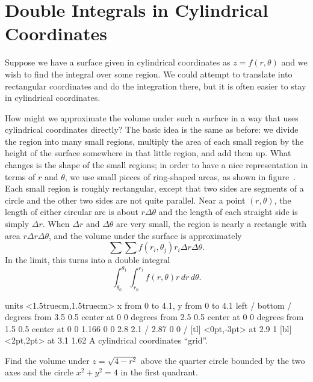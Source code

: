 \section{Double Integrals in Cylindrical Coordinates}{}{}
\nobreak
Suppose we have a surface given in cylindrical coordinates as
$z=f(r,\theta)$ and we wish to find the integral over some region. We
could attempt to translate into rectangular coordinates and do the
integration there, but it is often easier to stay in cylindrical
coordinates.

How might we approximate the volume under such a surface in a way that
uses cylindrical coordinates directly? The basic idea is the same as
before: we divide the region into many small regions, multiply the
area of each small region by the height of the surface somewhere in
that little region, and add them up. What changes is the shape of the
small regions; in order to have a nice representation in terms of $r$
and $\theta$, we use small pieces of ring-shaped areas, as shown in
figure~. Each small region
is roughly rectangular, except that two sides are segments of a circle
and the other two sides are not quite parallel. Near a point
$(r,\theta)$, the length of either circular arc is about
$r\Delta\theta$ and the length of each straight side is simply $\Delta
r$. When $\Delta r$ and $\Delta \theta$ are very small, the region is
nearly a rectangle with area $r\Delta r\Delta\theta$, and the volume
under the surface is approximately
$$\sum\sum f(r_i,\theta_j)r_i\Delta r\Delta\theta.$$
In the limit, this turns into a double integral
$$\int_{\theta_0}^{\theta_1}\int_{r_0}^{r_1} f(r,\theta)r\,dr\,d\theta.$$

\figure
\texonly
\vbox{\beginpicture
\normalgraphs
\ninepoint
\setcoordinatesystem units <1.5truecm,1.5truecm>
\setplotarea x from 0 to 4.1, y from 0 to 4.1
\axis left  /
\axis bottom  /
 degrees from 3.5 0.5 center at 0 0
 degrees from 2.5 0.5 center at 0 0
 degrees from 1.5 0.5 center at 0 0
\setlinear
{} 1.166 0 0 2.8 2.1 /
 2.87 0 0 /
 [tl] <0pt,-3pt> at 2.9 1
 [bl] <2pt,2pt> at 3.1 1.62
\endpicture}
\endtexonly
{}
\begincaption
A cylindrical coordinates ``grid''.
\endcaption
\endfigure

\example Find the volume under $z=\sqrt{4-r^2}$ 
above the quarter circle bounded by
the two axes and the circle $x^2+y^2=4$ in the first quadrant.

